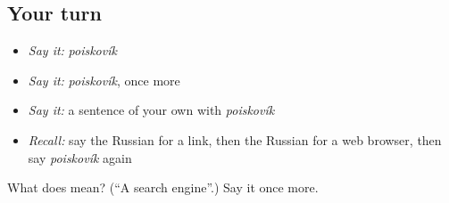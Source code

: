 \subsection*{Your turn}
\begin{itemize}
\raggedright
  \item \emph{Say it:} \emph{poiskovík}
  \item \emph{Say it:} \emph{poiskovík}, once more
  \item \emph{Say it:} a sentence of your own with \emph{poiskovík}
  \item \emph{Recall:} say the Russian for a link, then the Russian for a web browser, then say \emph{poiskovík} again
\end{itemize}

\begin{tcolorbox}[breakable,colback=teal!4,colframe=teal!35!black,title={Before you move on}]
What does  mean? (\textquotedblleft{}A search engine\textquotedblright{}.) Say it once more.
\end{tcolorbox}

